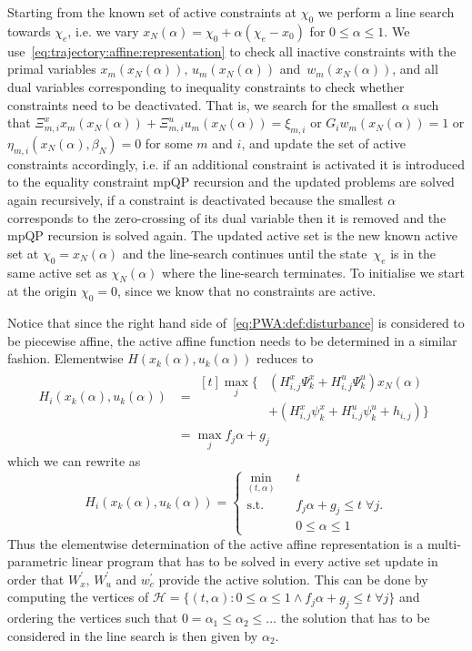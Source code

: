 \documentclass{ifacconf}
\begin{document}
Starting from the known set of active
constraints at $\chi_0$ we perform a line search towards $\chi_e$, i.e. we vary
$x_N(\alpha)=\chi_0+ \alpha(\chi_e-x_0)$ for $0\leq\alpha\leq1$. We
use~\eqref{eq:trajectory:affine:representation} to check all inactive constraints with the primal variables
$x_m(x_N(\alpha)),\, u_m(x_N(\alpha))$ and~$w_m(x_N(\alpha))$, and all dual variables corresponding to
inequality constraints to check whether constraints need to be deactivated. That is, we search for the
smallest $\alpha$ such that $\Xi_{m,i}^x x_m(x_N(\alpha))+\Xi_{m,i}^u u_m(x_N(\alpha))=\xi_{m,i}$ or
$G_iw_m(x_N(\alpha))=1$ or $\eta_{m,i}(x_N(\alpha),\allowbreak \beta_N)=0$ for some $m$ and $i$, and update the set of active
constraints accordingly, i.e. if an additional constraint is activated it is introduced to the equality
constraint mpQP recursion and the updated problems are solved again recursively, if a constraint is
deactivated because the smallest $\alpha$ corresponds to the zero-crossing of its dual variable then it is
removed and the
mpQP recursion is solved again. The updated active set is the new known active set at $\chi_0 = x_N(\alpha)$
and the line-search continues until the state~$\chi_e$ is in the same active set as $\chi_N(\alpha)$ where the
line-search terminates.  To initialise we start at the origin $\chi_0=0$, since we know that no constraints
are active.

Notice that since the right hand side of~\eqref{eq:PWA:def:disturbance} is considered to be piecewise affine, the active 
affine function needs to be determined in a similar fashion. Elementwise $H(x_k(\alpha),u_k(\alpha))$ reduces to 
\[
\begin{split}
	H_i(x_k(\alpha),u_k(\alpha)) &= \begin{aligned}[t] \max_j\{ & \left(H^x_{i,j} \Psi^x_k
          +H^u_{i,j}\Psi^u_k\right)x_N(\alpha)\\
        & + \left(H^x_{i,j} \psi^x_k +H^u_{i,j}\psi^u_k + h_{i,j}\right) \}
        \end{aligned}\\
	&=\max_j f_j\alpha + g_j
	\end{split}
\]
which we can rewrite as
\begin{equation}\label{eq:definition:as:mpLP}
	H_i(x_k(\alpha),u_k(\alpha)) = \left\{\begin{array}{rcl} \min_{(t,\alpha)}& &t\\
	\text{s.t.}& &f_j\alpha+g_j \leq t\; \forall j.\\
	& &0\leq\alpha\leq1
	\end{array}\right.
\end{equation}
Thus the elementwise determination of the active affine representation is a multi-parametric linear program
\citep[see e.g.][]{Gal:1995} that has to be solved in every active set update in order that $W_x^\prime,\,W_u^\prime$
and $w^\prime_c$ provide the active solution. This can be done by computing the vertices of
$\mathcal H = \{(t,\alpha):0\leq\alpha\leq1\wedge f_j\alpha+g_j\leq t\;\forall j\}$ and ordering the vertices
such that $0=\alpha_1\leq\alpha_2\leq\dots$ the solution that has to be considered in the line search is then given
by $\alpha_2$.
\end{document}
